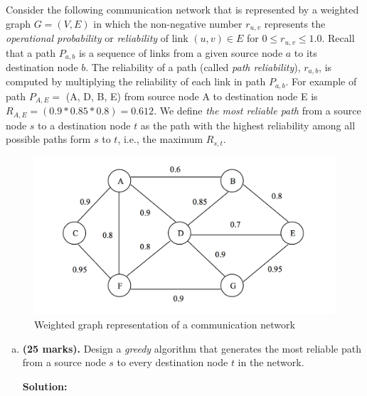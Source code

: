 \clearpage

\begin{homeworkProblem}
Consider the following communication network that is represented by a weighted 
graph $G = (V, E)$ in which the non-negative number $r_{u,v}$ represents the 
\textit{operational probability} or \textit{reliability} of link 
$(u, v) \in E$ for $0 \leq r_{u,v} \leq 1.0$. Recall that a path $P_{a,b}$ is a 
sequence of links from a given source node $a$ to its destination node $b$. The 
reliability of a path (called \textit{path reliability}), $r_{a,b}$, is computed 
by multiplying the reliability of each link in path $P_{a,b}$. For example of 
path $P_{A,E} =$ (A, D, B, E) from source node A to destination node E is 
$R_{A,E} = (0.9 * 0.85 * 0.8) = 0.612$. We define \textit{the most reliable path} 
from a source node $s$ to a destination node $t$ as the path with the highest 
reliability among all possible paths form $s$ to $t$, i.e., the maximum 
$R_{s,t}$. \\[2cm]

\begin{figure}[h]
\begin{center}

\includegraphics[scale=0.77]{Diag1}
\caption{Weighted graph representation of a communication network}

\end{center}
\end{figure}

\clearpage

\begin{enumerate}[a)]
	\item \textbf{(25 marks).} Design a \textit{greedy} algorithm that generates 
    the most reliable path from a source node $s$ to every destination node $t$ 
    in the network. 
    \par
	\textbf{Solution:}
    \par


\end{enumerate}
\end{homeworkProblem}
